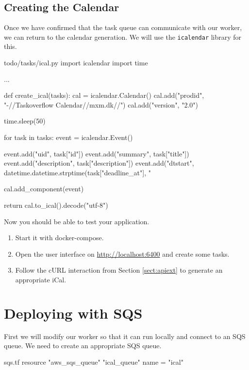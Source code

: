 \documentclass{csse4400}
\begin{document}
\subsection{Creating the Calendar}

Once we have confirmed that the task queue can communicate with our worker,
we can return to the calendar generation.
We will use the \texttt{icalendar} library for this.


\begin{code}[language=python,numbers=none]{todo/tasks/ical.py}
import icalendar
import time

...

def create_ical(tasks):
    cal = icalendar.Calendar()
    cal.add("prodid", "-//Taskoverflow Calendar//mxm.dk//")
    cal.add("version", "2.0")

    time.sleep(50)

    for task in tasks:
        event = icalendar.Event()
        
        event.add("uid", task["id"])
        event.add("summary", task["title"])
        event.add("description", task["description"])
        event.add("dtstart", datetime.datetime.strptime(task["deadline_at"], "%

        cal.add_component(event)

    return cal.to_ical().decode("utf-8")
\end{code}

Now you should be able to test your application.
\begin{enumerate}
    \item Start it with docker-compose.
    \item Open the user interface on \url{http://localhost:6400} and create some tasks.
    \item Follow the cURL interaction from Section \ref{sect:apiext} to generate an appropriate iCal.
\end{enumerate}

\section{Deploying with SQS}

First we will modify our worker so that it can run locally and connect to an SQS queue.
We need to create an appropriate SQS queue.

\begin{code}[language=terraform,numbers=none]{sqs.tf}
resource "aws_sqs_queue" "ical_queue" {
    name = "ical"
}
\end{code}
\end{document}
